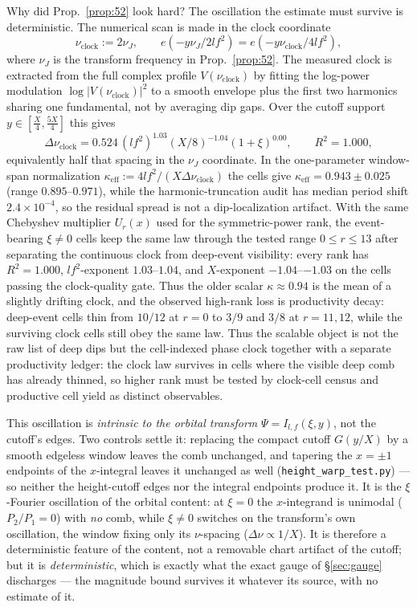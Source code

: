 \documentclass[11pt]{article}
\theoremstyle{definition}
\begin{document}
Why did Prop.~\ref{prop:52} look hard? The oscillation the estimate must survive is deterministic.
The numerical scan is made in the clock coordinate
\[
  \nu_{\mathrm{clock}}:=2\nu_J,\qquad
  e(-y\nu_J/2lf^2)=e(-y\nu_{\mathrm{clock}}/4lf^2),
\]
where $\nu_J$ is the transform frequency in Prop.~\ref{prop:52}. The measured clock is extracted from the
full complex profile $V(\nu_{\mathrm{clock}})$ by fitting the log-power modulation
$\log |V(\nu_{\mathrm{clock}})|^2$ to a smooth envelope plus the first two harmonics sharing one
fundamental, not by averaging dip gaps. Over the cutoff support $y\in[\tfrac X4,\tfrac{5X}4]$ this gives
\[
  \Delta\nu_{\mathrm{clock}}
   =0.524\,(lf^2)^{1.03}(X/8)^{-1.04}(1+\xi)^{0.00},\qquad R^2=1.000,
\]
equivalently half that spacing in the $\nu_J$ coordinate. In the one-parameter window-span normalization
$\kappa_{\mathrm{eff}}:=4lf^2/(X\Delta\nu_{\mathrm{clock}})$ the cells give
$\kappa_{\mathrm{eff}}=0.943\pm0.025$ (range $0.895$--$0.971$), while the harmonic-truncation audit has
median period shift $2.4\times10^{-4}$, so the residual spread is not a dip-localization artifact. With the
same Chebyshev multiplier $U_r(x)$ used for the symmetric-power rank, the event-bearing $\xi\ne0$ cells keep
the same law through the tested range $0\le r\le13$ after separating the continuous clock from deep-event
visibility: every rank has $R^2=1.000$, $lf^2$-exponent $1.03$--$1.04$, and $X$-exponent
$-1.04$--$-1.03$ on the cells passing the clock-quality gate. Thus the older scalar
$\kappa\approx0.94$ is the mean of a slightly drifting clock, and the observed high-rank loss is productivity
decay: deep-event cells thin from $10/12$ at $r=0$ to $3/9$ and $3/8$ at $r=11,12$, while the surviving
clock cells still obey the same law. Thus the scalable object is not the raw list of deep dips but the
cell-indexed phase clock together with a separate productivity ledger: the clock law survives in cells where
the visible deep comb has already thinned, so higher rank must be tested by clock-cell census and productive
cell yield as distinct observables.

This oscillation is \emph{intrinsic to the orbital transform} $\Psi=I_{l,f}(\xi,y)$, not the cutoff's edges.
Two controls settle it: replacing the compact cutoff $G(y/X)$ by a smooth edgeless window leaves the comb
unchanged, and tapering the $x=\pm1$ endpoints of the $x$-integral leaves it unchanged as well
(\texttt{height\_warp\_test.py}) --- so neither the height-cutoff edges nor the integral endpoints produce it.
It is the $\xi$-Fourier oscillation of the orbital content: at $\xi=0$ the $x$-integrand is unimodal
($P_2/P_1=0$) with \emph{no} comb, while $\xi\neq0$ switches on the transform's own oscillation, the window
fixing only its $\nu$-spacing ($\Delta\nu\propto1/X$). It is therefore a deterministic feature of the content,
not a removable chart artifact of the cutoff; but it is \emph{deterministic}, which is exactly what the exact
gauge of \S\ref{sec:gauge} discharges --- the magnitude bound survives it whatever its source, with no estimate
of it.
\end{document}
